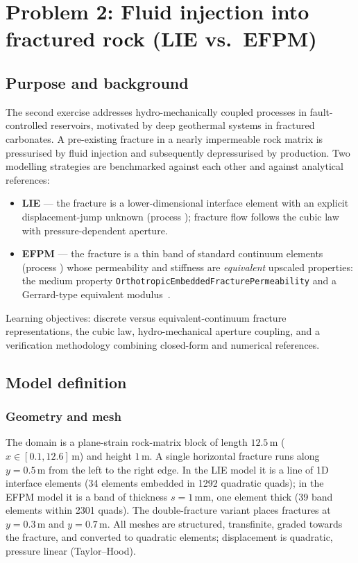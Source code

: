 \documentclass[11pt,a4paper]{tubaf-report}
\begin{document}
\chapter{Problem 2: Fluid injection into fractured rock (LIE vs.\ EFPM)}
\label{ch:lie}

\section{Purpose and background}

The second exercise addresses hydro-mechanically coupled processes in
fault-controlled reservoirs, motivated by deep geothermal systems in
fractured carbonates. A pre-existing fracture in a nearly impermeable rock
matrix is pressurised by fluid injection and subsequently depressurised by
production. Two modelling strategies are benchmarked against each other and
against analytical references:
\begin{itemize}[nosep]
  \item \textbf{LIE} --- the fracture is a lower-dimensional interface
        element with an explicit displacement-jump unknown
        (process ); fracture flow follows
        the cubic law with pressure-dependent aperture.
  \item \textbf{EFPM} --- the fracture is a thin band of standard continuum
        elements (process ) whose permeability and
        stiffness are \emph{equivalent} upscaled properties: the medium
        property
        \texttt{Orthotropic\allowbreak Embedded\allowbreak Fracture\allowbreak \allowbreak Permeability}
        and a Gerrard-type equivalent modulus~\cite{gerrard1982}.
\end{itemize}
Learning objectives: discrete versus equivalent-continuum fracture
representations, the cubic law, hydro-mechanical aperture coupling, and a
verification methodology combining closed-form and numerical references.

\section{Model definition}

\subsection{Geometry and mesh}

The domain is a plane-strain rock-matrix block of length
$12.5\,\mathrm m$ ($x\in[0.1,12.6]\,\mathrm m$) and height $1\,\mathrm m$. A
single horizontal fracture runs along $y=0.5\,\mathrm m$ from the left to
the right edge. In the LIE model it is a line of 1D interface elements (34
elements embedded in 1292 quadratic quads); in the EFPM model it is a band of
thickness $s=1\,\mathrm{mm}$, one element thick (39 band elements within
2301 quads). The double-fracture variant places fractures at
$y=0.3\,\mathrm m$ and $y=0.7\,\mathrm m$. All meshes are structured,
transfinite, graded towards the fracture, and converted to quadratic
elements; displacement is quadratic, pressure linear (Taylor--Hood).
\end{document}

